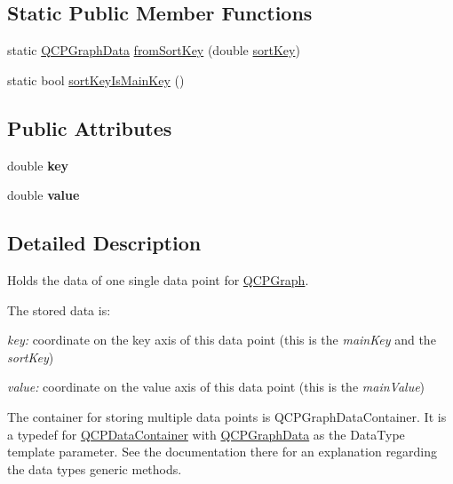 \subsection*{Static Public Member Functions}
\begin{DoxyCompactItemize}
\item 
static \hyperlink{classQCPGraphData}{Q\+C\+P\+Graph\+Data} \hyperlink{classQCPGraphData_a4646eac7f7a48970ea0fc5153aab0e77}{from\+Sort\+Key} (double \hyperlink{classQCPGraphData_aae097cdf07f2c31edbbc7931e1e2e47f}{sort\+Key})
\item 
static bool \hyperlink{classQCPGraphData_a1c98dfd21b82321a173db4ff860dfd21}{sort\+Key\+Is\+Main\+Key} ()
\end{DoxyCompactItemize}
\subsection*{Public Attributes}
\begin{DoxyCompactItemize}
\item 
double {\bfseries key}\hypertarget{classQCPGraphData_a2fcebdf84af975761c0661237d7e28ec}{}\label{classQCPGraphData_a2fcebdf84af975761c0661237d7e28ec}

\item 
double {\bfseries value}\hypertarget{classQCPGraphData_ac97e3ddbdcbe0b58d0b4d6f95250d59c}{}\label{classQCPGraphData_ac97e3ddbdcbe0b58d0b4d6f95250d59c}

\end{DoxyCompactItemize}


\subsection{Detailed Description}
Holds the data of one single data point for \hyperlink{classQCPGraph}{Q\+C\+P\+Graph}. 

The stored data is\+: \begin{DoxyItemize}
\item {\itshape key\+:} coordinate on the key axis of this data point (this is the {\itshape main\+Key} and the {\itshape sort\+Key}) \item {\itshape value\+:} coordinate on the value axis of this data point (this is the {\itshape main\+Value})\end{DoxyItemize}
The container for storing multiple data points is Q\+C\+P\+Graph\+Data\+Container. It is a typedef for \hyperlink{classQCPDataContainer}{Q\+C\+P\+Data\+Container} with \hyperlink{classQCPGraphData}{Q\+C\+P\+Graph\+Data} as the Data\+Type template parameter. See the documentation there for an explanation regarding the data type\textquotesingle{}s generic methods.

